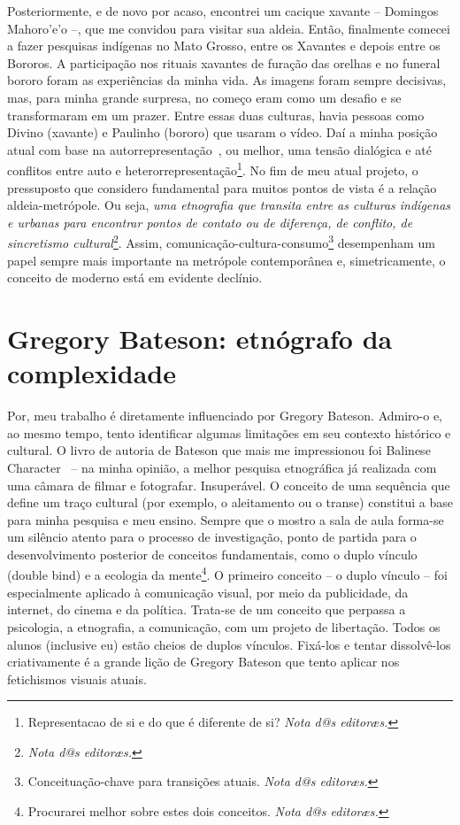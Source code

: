 \documentclass[a4paper, 12pt]{article} %
\makeatletter
\newcommand{\ftnt}[1]{\footnote{#1 \emph{Nota d@s editoræs.}}}
\makeatother
\begin{document}
Posteriormente, e de novo por acaso, encontrei um cacique xavante – Domingos Mahoro’e’o –, que me convidou para visitar sua aldeia. Então, finalmente comecei a fazer pesquisas indígenas no Mato Grosso, entre os Xavantes e depois entre os Bororos. A participação nos rituais xavantes de furação das orelhas e no funeral bororo foram as experiências da minha vida. As imagens foram sempre decisivas, mas, para minha grande surpresa, no começo eram como um desafio e se transformaram em um prazer. Entre essas duas culturas, havia pessoas como Divino (xavante) e Paulinho (bororo) que usaram o vídeo. Daí a minha posição atual com base na autorrepresentação~\cite{b2}, ou melhor, uma tensão dialógica e até conflitos entre auto e heterorrepresentação\ftnt{Representacao de si e do que é diferente de si?}. No fim de meu atual projeto, o pressuposto que considero fundamental para muitos pontos de vista é a relação aldeia-metrópole. Ou seja, \emph{uma etnografia que transita entre as culturas indígenas e urbanas para encontrar pontos de contato ou de diferença, de conflito, de sincretismo cultural}\ftnt{}. Assim, comunicação-cultura-consumo\ftnt{Conceituação-chave para transições atuais.} desempenham um papel sempre mais importante na metrópole contemporânea e, simetricamente, o conceito de moderno está em evidente declínio.
\nocite{b3}


\section*{Gregory Bateson: etnógrafo da complexidade}\label{sec:bat}

Por, meu trabalho é diretamente influenciado por Gregory Bateson. Admiro-o e, ao mesmo tempo, tento identificar algumas limitações em seu contexto histórico e cultural. O livro de autoria de Bateson que mais me impressionou foi Balinese Character~\cite{b4} – na minha opinião, a melhor pesquisa etnográfica já realizada com uma câmara de filmar e fotografar. Insuperável. O conceito de uma sequência que define um traço cultural (por exemplo, o aleitamento ou o transe) constitui a base para minha pesquisa e meu ensino. Sempre que o mostro a sala de aula forma-se um silêncio atento para o processo de investigação, ponto de partida para o desenvolvimento posterior de conceitos fundamentais, como o duplo vínculo (double bind) e a ecologia da mente\ftnt{Procurarei melhor sobre estes dois conceitos.}. O primeiro conceito – o duplo vínculo – foi especialmente aplicado à comunicação visual, por meio da publicidade, da internet, do cinema e da política. Trata-se de um conceito que perpassa a psicologia, a etnografia, a comunicação, com um projeto de libertação. Todos os alunos (inclusive eu) estão cheios de duplos vínculos. Fixá-los e tentar dissolvê-los criativamente é a grande lição de Gregory Bateson que tento aplicar nos fetichismos visuais atuais.
\end{document}
